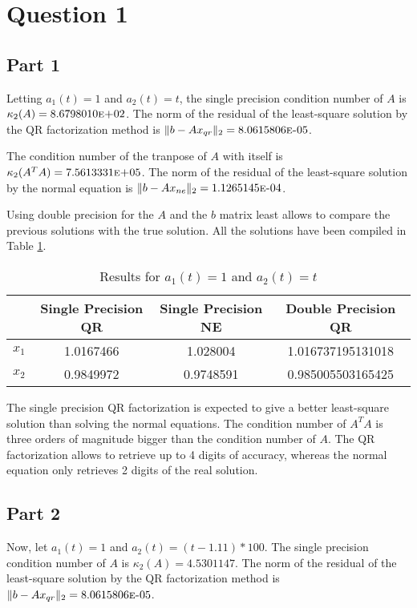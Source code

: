 \documentclass[letterpaper,12pt,]{article}
\date{April 10, 2015}
\begin{document}


\section*{Question 1}

\subsection*{Part 1}
Letting $a_{1}(t) = 1$ and $a_{2}(t) = t$, the single precision condition number of $A$ is $\kappa_2(A)=8.6798010\text{\sc{e}+}02$. The norm of the residual of the least-square solution by the QR factorization method is $\|b-Ax_{qr}\|_2 = 8.0615806\text{\sc{e}-}05$.

The condition number of the tranpose of $A$ with itself is $\kappa_{2}(A^{T}A) = 7.5613331\text{\sc{e}+}05$. The norm of the residual of the least-square solution by the normal equation is $\|b-Ax_{ne}\|_2 = 1.1265145\text{\sc{e}-}04$.

Using double precision for the $A$ and the $b$ matrix least allows to compare the previous solutions with the true solution. All the solutions have been compiled in Table \ref{tab:r1}.

\begin{table}[h]
\centering
\begin{tabular}{cccc} \toprule
    {} & {Single Precision QR} & {Single Precision NE} & {Double Precision QR}\\ \midrule
    $x_1$ &	1.0167466 & 1.028004 & 1.016737195131018\\
    $x_2$ &	0.9849972 & 0.9748591 & 0.985005503165425\\
\bottomrule
\end{tabular}
\caption{Results for $a_{1}(t) = 1$ and $a_{2}(t) = t$}
\label{tab:r1}
\end{table}

The single precision QR factorization is expected to give a better least-square solution than solving the normal equations. The condition number of $A^TA$ is three orders of magnitude bigger than the condition number of $A$. The QR factorization allows to retrieve up to 4 digits of accuracy, whereas the normal equation only retrieves 2 digits of the real solution.

\subsection*{Part 2}

Now, let $a_{1}(t) = 1$ and $a_{2}(t) = (t-1.11) \ast 100$. The single precision condition number of $A$ is $\kappa_2(A)=4.5301147$. The norm of the residual of the least-square solution by the QR factorization method is $\|b-Ax_{qr}\|_2 = 8.0615806\text{\sc{e}-}05$.
\end{document}
